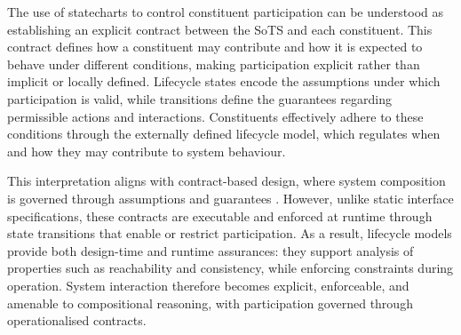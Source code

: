 The use of statecharts to control constituent participation can be understood as establishing an explicit contract between the SoTS and each constituent. This contract defines how a constituent may contribute and how it is expected to behave under different conditions, making participation explicit rather than implicit or locally defined. Lifecycle states encode the assumptions under which participation is valid, while transitions define the guarantees regarding permissible actions and interactions. Constituents effectively adhere to these conditions through the externally defined lifecycle model, which regulates when and how they may contribute to system behaviour.

This interpretation aligns with contract-based design, where system composition is governed through assumptions and guarantees \cite{benveniste2012contracts}. However, unlike static interface specifications, these contracts are executable and enforced at runtime through state transitions that enable or restrict participation. As a result, lifecycle models provide both design-time and runtime assurances: they support analysis of properties such as reachability and consistency, while enforcing constraints during operation. System interaction therefore becomes explicit, enforceable, and amenable to compositional reasoning, with participation governed through operationalised contracts.






